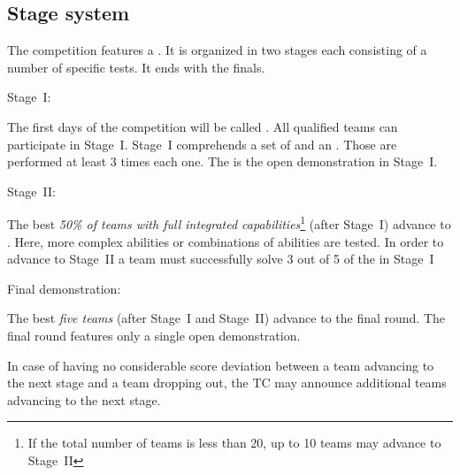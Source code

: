 \subsection{Stage system}\label{rule:stages}

The competition features a . 
It is organized in two stages each consisting of a number of specific tests. 
It ends with the finals.

\begin{enumerate}
{\bf\item Stage~I:} The first days of the competition will be called . 
  All qualified teams can participate in Stage~I.
  Stage~I comprehends a set of  and an . Those  are performed at least 3 times each one.
  The  is the open demonstration in Stage~I.

{\bf\item Stage~II:} The best \emph{50\% of teams with full integrated capabilities}\footnote{If the total number of teams is less than 20, up to 10 teams may advance to Stage~II} (after Stage~I) advance to . 
  Here, more complex abilities or combinations of abilities are tested. 
  In order to advance to Stage~II a team must successfully solve 3 out of 5 of the  in Stage~I
{\bf\item Final demonstration:} The best \emph{five teams} (after Stage~I and Stage~II) advance to the final round. 
  The final round features only a single open demonstration.
\end{enumerate}
In case of having no considerable score deviation between a team advancing to the next stage and a team dropping out, the TC may announce additional teams advancing to the next stage.


